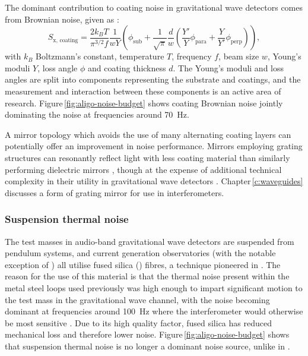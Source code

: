 The dominant contribution to coating noise in gravitational wave detectors comes from Brownian noise, given as \cite{Harry2002}:
\begin{equation}
  S_{\text{x, coating}} = \frac{2 k_B T}{\pi^{3/2} f} \frac{1}{w Y} \left( \phi_{\text{sub}} + \frac{1}{\sqrt{\pi}} \frac{d}{w} \left( \frac{Y'}{Y} \phi_{\text{para}} + \frac{Y}{Y'} \phi_{\text{perp}} \right) \right),
\end{equation}
with $k_B$ Boltzmann's constant, temperature $T$, frequency $f$, beam size $w$, Young's moduli $Y$, loss angle $\phi$ and coating thickness $d$. The Young's moduli and loss angles are split into components representing the substrate and coatings, and the measurement and interaction between these components is an active area of research. Figure\,\ref{fig:aligo-noise-budget} shows coating Brownian noise jointly dominating the noise at frequencies around \SI{70}{\hertz}.

A mirror topology which avoids the use of many alternating coating layers can potentially offer an improvement in noise performance. Mirrors employing grating structures can resonantly reflect light with less coating material than similarly performing dielectric mirrors \cite{Mashev1985}, though at the expense of additional technical complexity in their utility in gravitational wave detectors \cite{Leavey2015}. Chapter\,\ref{c:waveguides} discusses a form of grating mirror for use in interferometers.

\subsubsection{\label{sec:sus-thermal-noise}Suspension thermal noise}
The test masses in audio-band gravitational wave detectors are suspended from pendulum systems, and current generation observatories (with the notable exception of \KAGRA{}) all utilise fused silica () fibres, a technique pioneered in \GEO{}. The reason for the use of this material is that the thermal noise present within the metal steel loops used previously was high enough to impart significant motion to the test mass in the gravitational wave channel, with the noise becoming dominant at frequencies around \SI{100}{\hertz} where the interferometer would otherwise be most sensitive \cite{Hammond2012}. Due to its high quality factor, fused silica has reduced mechanical loss and therefore lower noise. Figure\,\ref{fig:aligo-noise-budget} shows that suspension thermal noise is no longer a dominant noise source, unlike in \ILIGO{} .

